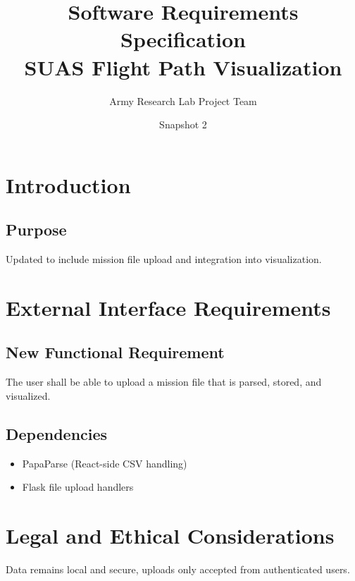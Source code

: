\documentclass[12pt]{article}
\title{Software Requirements Specification\\SUAS Flight Path Visualization}
\author{Army Research Lab Project Team}
\date{Snapshot 2}
\begin{document}
\maketitle

\tableofcontents
\newpage

\section{Introduction}
\subsection{Purpose}
Updated to include mission file upload and integration into visualization.

\section{External Interface Requirements}
\subsection{New Functional Requirement}
The user shall be able to upload a mission file that is parsed, stored, and visualized.

\subsection{Dependencies}
\begin{itemize}
  \item PapaParse (React-side CSV handling)
  \item Flask file upload handlers
\end{itemize}

\section{Legal and Ethical Considerations}
Data remains local and secure, uploads only accepted from authenticated users.
\end{document}
